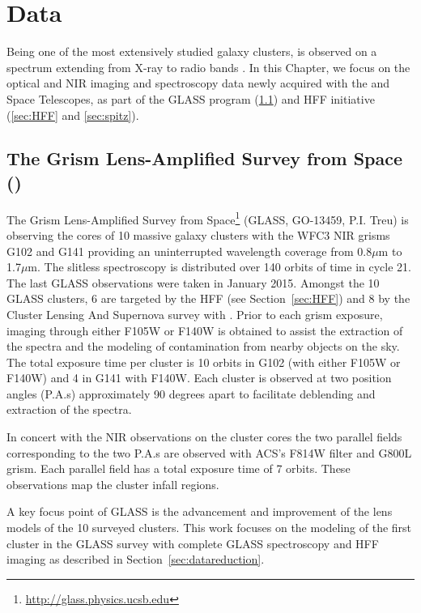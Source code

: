 \section{Data}
\label{sec:data}

Being one of the most extensively studied galaxy clusters, \cler is observed on a spectrum extending
from X-ray to radio bands \citep[e.g.][]{2004MNRAS.349..385K}. In this Chapter, we focus on the optical and NIR
imaging and spectroscopy data newly acquired with the \hubble and
\spitzer Space Telescopes, as part of the GLASS program (\ref{sec:glass}) and
HFF initiative (\ref{sec:HFF} and \ref{sec:spitz}).

\subsection{The Grism Lens-Amplified Survey from Space (\glass)}
\label{sec:glass}

The Grism Lens-Amplified Survey from Space\footnote{\url{http://glass.physics.ucsb.edu}} (GLASS, GO-13459, P.I.
Treu) is observing the cores of 10 massive galaxy clusters with the \hst WFC3 NIR grisms G102 and G141 providing
an uninterrupted wavelength coverage from 0.8$\mu$m to 1.7$\mu$m.  The slitless spectroscopy is distributed over
140 orbits of \hst time in cycle 21. The last GLASS observations were taken in January 2015.  Amongst the 10
GLASS clusters, 6 are targeted by the HFF (see Section~\ref{sec:HFF}) and 8 by the Cluster Lensing And Supernova
survey with \hubble \citep[CLASH; P.I. Postman,][]{Postman:2012p27556}. Prior to each grism exposure, imaging
through either F105W or F140W is obtained to assist the extraction of the spectra and the modeling of
contamination from nearby objects on the sky.  The total exposure time per cluster is 10 orbits in G102 (with
either F105W or F140W) and 4 in G141 with F140W. Each cluster is observed at two position angles (P.A.s)
approximately 90 degrees apart to facilitate deblending and extraction of the spectra.

In concert with the NIR observations on the cluster cores
the two parallel fields corresponding to the two P.A.s are observed
with ACS's F814W filter and G800L grism.  Each parallel field has a
total exposure time of 7 orbits.  These observations map the cluster
infall regions.

A key focus point of GLASS is the advancement and improvement of the
lens models of the 10 surveyed clusters.  This work focuses on the
modeling of the first cluster in the GLASS survey with complete GLASS
spectroscopy and HFF imaging as described in
Section~\ref{sec:datareduction}.

